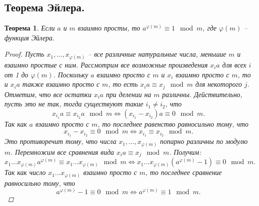 \documentclass{article}
\newtheorem{theorem}{Теорема}
\begin{document}
\subsection{Теорема Эйлера.}
\begin{theorem}
Если $a$ и $m$ взаимно просты, то $a^{\varphi(m)} \equiv 1 \mod{m}$, где $\varphi(m)$ -- функция Эйлера.
\begin{proof}
Пусть $x_1,...,x_{\varphi(m)}$ -- все различные натуральные числа, меньшие $m$ и взаимно простые с ним. Рассмотрим все возможные произведения $x_ia$ для всех $i$ от 1 до $\varphi(m)$.
Поскольку $a$ взаимно просто с $m$ и $x_i$ взаимно просто с  $m$, то и $x_ia$ также взаимно просто с $m$, то есть $x_ia \equiv x_j \mod{m}$ для некоторого $j$.
Отметим, что все остатки $x_ia$ при делении на $m$ различны. Действительно, пусть это не так, тогда существуют такие $i_1 \neq i_2$, что
\[
x_{i_1}a \equiv x_{i_2}a \mod{m}
\Leftrightarrow
(x_{i_1} - x_{i_2})a \equiv 0 \mod{m}.
\]
Так как $a$ взаимно просто с $m$, то последнее равенство равносильно тому, что
\[
x_{i_1} - x_{i_2} \equiv 0 \mod{m}
\Leftrightarrow
x_{i_1} \equiv x_{i_2} \mod{m}.
\]
Это противоречит тому, что числа $x_1,...,x_{\varphi(m)}$ попарно различны по модулю $m$.
Перемножим все сравнения вида $x_ia \equiv x_j \mod{m}$. Получим:
\[
x_1...x_{\varphi (m)}a^{\varphi (m)} \equiv x_1...x_{\varphi (m)} \mod{m}
\Leftrightarrow
x_1...x_{\varphi (m)}(a^{\varphi (m)} - 1) \equiv 0 \mod{m}.
\]
Так как число $x_1...x_{\varphi (m)}$ взаимно просто с $m$, то последнее сравнение равносильно тому, что
\[
a^{\varphi (m)} - 1 \equiv 0 \mod{m}
\Leftrightarrow
a^{\varphi (m)} \equiv 1 \mod{m}.
\]
\end{proof}
\end{theorem}
\end{document}
